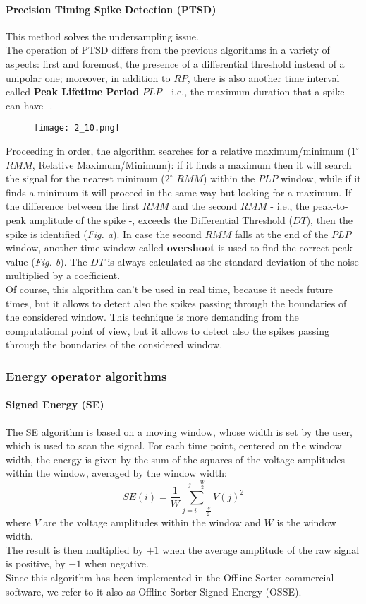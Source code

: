 \paragraph{Precision Timing Spike Detection (PTSD)}
This method solves the undersampling issue. \\ The operation of PTSD differs from the previous
algorithms in a variety of aspects: first and foremost, the presence of a differential threshold
instead of a unipolar one; moreover, in addition to \(RP\), there is also another time interval
called \textbf{Peak Lifetime Period} \(PLP\) - i.e., the maximum duration that a spike can have -.
\begin{figure}[H]
    \centering
    \texttt{[image: 2\_10.png]}
\end{figure}
Proceeding in order, the algorithm searches for a relative maximum/minimum (\(1^\circ\) \(RMM\),
Relative Maximum/Minimum): if it finds a maximum then it will search the signal for
the nearest minimum (\(2^\circ\) \(RMM\)) within the \(PLP\) window, while if it finds a minimum it will proceed
in the same way but looking for a maximum. If the difference between the first \(RMM\) and the second \(RMM\)
- i.e., the peak-to-peak amplitude of the spike -, exceeds the Differential Threshold (\(DT\)),
then the spike is identified (\textit{Fig. a}). In case the second \(RMM\) falls at the end of the \(PLP\) window,
another time window called \textbf{overshoot} is used to find the correct peak value (\textit{Fig. b}). The \(DT\) is
always calculated as the standard deviation of the noise multiplied by a coefficient.\\
Of course, this algorithm can't be used in real time, because it needs future times, but it allows to detect also the
spikes passing through the boundaries of the considered window.
This technique is more demanding from the computational point of view, but it allows to detect
also the spikes passing through the boundaries of the considered window.
\subsubsection{Energy operator algorithms}
\paragraph{Signed Energy (SE)}
The SE algorithm is based on a moving window, whose width is set by the user,
which is used to scan the signal. For each time point, centered on the window width,
the energy is given by the sum of the squares of the voltage amplitudes within the
window, averaged by the window width:
\begin{equation*}
    SE(i)=\frac{1}{W}\sum_{j=i-\frac{W}{2}}^{j+\frac{W}{2}}V(j)^2
\end{equation*}
where \(V\) are the voltage amplitudes within the window and \(W\) is the window width.\\
The result is then multiplied by \(+1\) when the average amplitude of the raw signal is positive,
by \(-1\) when negative.\\
Since this algorithm has been implemented in the Offline Sorter commercial software,
we refer to it also as Offline Sorter Signed Energy (OSSE).
